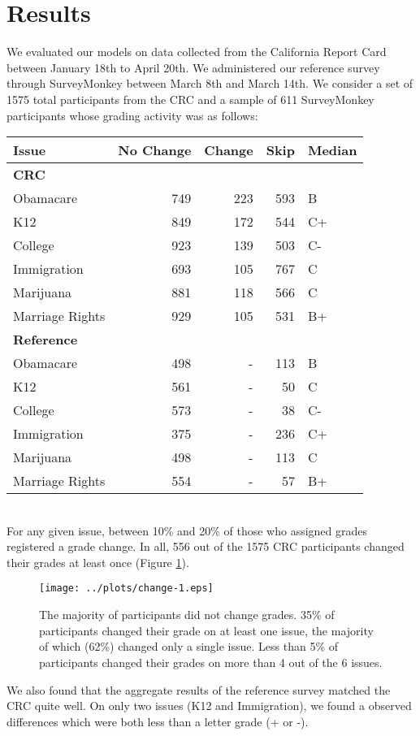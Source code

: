 \section{Results}
We evaluated our models on data collected from the California Report Card between January 18th to April 20th.
We administered our reference survey through SurveyMonkey between March 8th and March 14th.
We consider a set of 1575 total participants from the CRC and a sample of 611 SurveyMonkey participants whose grading activity was as follows:\\[1\baselineskip]
\begin{tabular}[!ht]{ l | r | r | r | l }
Issue & No Change & Change & Skip & Median \\
\hline
\hline
  \multicolumn{5}{l}{\textbf{CRC}}\\
  \hline
  Obamacare & 749 & 223 & 593 & B \\
  \hline
  K12 & 849 & 172 & 544 & C+ \\
  \hline
  College & 923 & 139 & 503 & C-\\
  \hline
  Immigration & 693 & 105 & 767 & C \\
  \hline
  Marijuana & 881 & 118 & 566 & C \\
  \hline
  Marriage Rights & 929 & 105 & 531 & B+\\
\hline
\hline
\multicolumn{5}{l}{\textbf{Reference}}\\
\hline
  Obamacare & 498 & - & 113 & B \\
  \hline
  K12 & 561 & - & 50 & C \\
  \hline
  College & 573 & - & 38 & C-\\
  \hline
  Immigration & 375 & - & 236 & C+ \\
  \hline
  Marijuana & 498 & - & 113 & C \\
  \hline
  Marriage Rights & 554 & - & 57 & B+
\end{tabular}\\[1\baselineskip]

For any given issue, between 10\% and 20\% of those who assigned grades registered a grade change.
In all, 556 out of the 1575 CRC participants changed their grades at least once (Figure \ref{change-1}).
\begin{figure}[hb]
  \centering
    \texttt{[image: ../plots/change-1.eps]}
      \caption{The majority of participants did not change grades. 35\% of participants changed their grade on at least one issue, the majority of which (62\%) changed only a single issue. Less than 5\% of participants changed their grades on more than 4 out of the 6 issues.}
      \label{change-1}
\end{figure}
We also found that the aggregate results of the reference survey matched the CRC quite well.
On only two issues (K12 and Immigration), we found a observed differences which were both less than a letter grade (+ or -).

